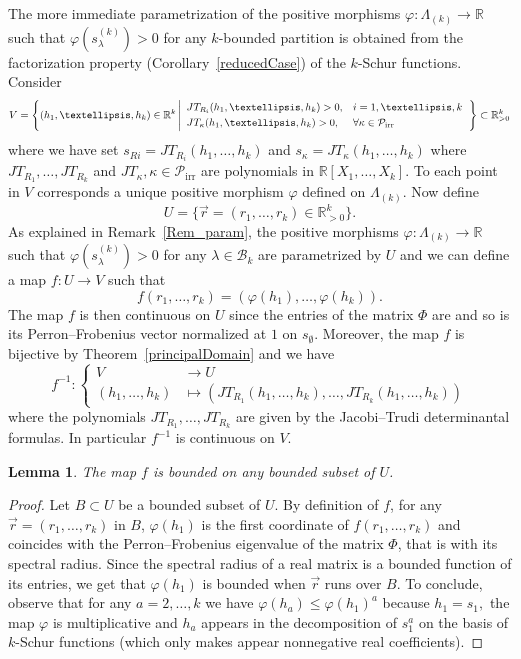 \documentclass[10pt,a4paper]{amsart}
\newtheorem{lemma}[theorem]{Lemma}
\theoremstyle{definition}
\DeclareMathOperator{\irr}{irr}
\begin{document}
\label{SubSec_Twoparam}The more immediate parametrization of the positive
morphisms $\varphi:\Lambda_{(k)}\rightarrow\mathbb{R}$ such that
$\varphi(s_{\lambda}^{(k)})>0$ for any $k$-bounded partition is obtained from
the factorization property (Corollary~\ref{reducedCase}) of the $k$-Schur
functions. Consider
\[
V=\left\{ (h_{1},\ldots,h_{k})\in\mathbb{R}^{k}\left\vert
\begin{array}[c]{ll}
%
JT_{R_{i}}(h_{1},\ldots,h_{k})>0,&i=1,\ldots,k\\[3pt]
JT_{\kappa}(h_{1},\ldots,h_{k})>0, &\forall\kappa\in\mathcal{P}_{\irr }%
\end{array}\right.
\right\} \subset\mathbb{R}_{>0}^{k}%
\]
where we have set $s_{Ri}=JT_{R_{i}}(h_{1},\ldots,h_{k})$ and $s_{\kappa
}=JT_{\kappa}(h_{1},\ldots,h_{k})$ where $JT_{R_{1}},\ldots,JT_{R_{k}}$ and
$JT_{\kappa},\kappa\in\mathcal{P}_{\irr }$ are polynomials in
$\mathbb{R}[X_{1},\ldots,X_{k}]$. To each point in $V$ corresponds a unique
positive morphism $\varphi$ defined on $\Lambda_{(k)}$. Now define%
\[
U=\{\vec{r}=(r_{1},\ldots,r_{k})\in\mathbb{R}_{>0}^{k}\}.
\]
As explained in Remark~\ref{Rem_param}, the positive morphisms $\varphi
:\Lambda_{(k)}\rightarrow\mathbb{R}$ such that $\varphi(s_{\lambda}^{(k)})>0$
for any $\lambda\in\mathcal{B}_{k}$ are parametrized by $U$ and we can define
a map $f:U\rightarrow V$ such that
\[
f(r_{1},\ldots,r_{k})=(\varphi(h_{1}),\ldots,\varphi(h_{k})).
\]
The map $f$ is then continuous on $U$ since the entries of the matrix $\Phi$
are and so is its Perron--Frobenius vector normalized at $1$ on $s_{\emptyset}%
$. Moreover, the map $f$ is bijective by Theorem~\ref{principalDomain} and we
have
\[
f^{-1}:\left\{
\begin{aligned}
V&\rightarrow U\\
(h_{1},\ldots,h_{k})&\mapsto(JT_{R_{1}}(h_{1},\ldots,h_{k}),\ldots,JT_{R_{k}%
}(h_{1},\ldots,h_{k}))
\end{aligned}
\right.
\]
where the polynomials $JT_{R_{1}},\ldots,JT_{R_{k}}$ are given by the
Jacobi--Trudi determinantal formulas. In particular $f^{-1}$ is continuous on
$V$.

\begin{lemma}
\label{Lemma_Bounded}The map $f$ is bounded on any bounded subset of $U$.
\end{lemma}

\begin{proof}
Let $B\subset U$ be a bounded subset of $U$. By definition of $f$, for any
$\vec{r}=(r_{1},\ldots,r_{k})$ in $B$, $\varphi(h_{1})$ is the first
coordinate of $f(r_{1},\ldots,r_{k})$ and coincides with the Perron--Frobenius
eigenvalue of the matrix $\Phi$, that is with its spectral radius. Since the
spectral radius of a real matrix is a bounded function of its entries, we get
that $\varphi(h_{1})$ is bounded when $\vec{r}$ runs over $B$. To conclude,
observe that for any $a=2,\ldots,k$ we have $\varphi(h_{a})\leq\varphi
(h_{1})^{a}$ because $h_{1}=s_{1},$ the map $\varphi$ is multiplicative and
$h_{a}$ appears in the decomposition of $s_{1}^{a}$ on the basis of $k$-Schur
functions (which only makes appear nonnegative real coefficients).
\end{proof}
\end{document}
